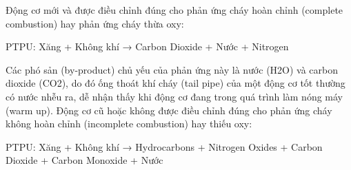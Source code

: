 Động cơ mới và được điều chỉnh đúng cho phản ứng cháy hoàn chỉnh (complete combustion) hay phản ứng cháy thừa oxy:

\begin{center}
PTPU: Xăng + Không khí → Carbon Dioxide + Nước + Nitrogen
\end{center} 
Các phó sản (by-product) chủ yếu của phản ứng này là nước (H2O) và carbon dioxide (CO2), do đó ống thoát khí cháy (tail pipe) của một động cơ tốt thường có nước nhễu ra, dễ nhận thấy khi động cơ đang trong quá trình làm nóng máy (warm up).
Động cơ cũ hoặc không được điều chỉnh đúng cho phản ứng cháy không hoàn chỉnh (incomplete combustion) hay thiếu oxy:
\begin{center}
PTPU: Xăng + Không khí → Hydrocarbons + Nitrogen Oxides + Carbon Dioxide + Carbon Monoxide + Nước
\end{center}

